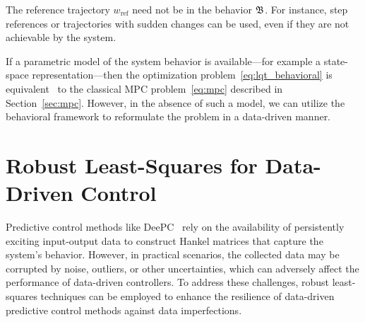 \begin{Note}
    The reference trajectory $w_{\textrm{ref}}$ need not be in the behavior $\mathfrak{B}$. For instance, step references or trajectories with sudden changes can be used, even if they are not achievable by the system.
\end{Note}

If a parametric model of the system behavior is available---for example a state-space representation---then the optimization problem~\eqref{eq:lqt_behavioral} is equivalent~\cite{jeremy2019} to the classical MPC problem~\eqref{eq:mpc} described in Section~\ref{sec:mpc}. However, in the absence of such a model, we can utilize the behavioral framework to reformulate the problem in a data-driven manner.

\section{Robust Least-Squares for Data-Driven Control}
Predictive control methods like DeePC~\cite{jeremy2019} rely on the availability of persistently exciting input-output data to construct Hankel matrices that capture the system's behavior. However, in practical scenarios, the collected data may be corrupted by noise, outliers, or other uncertainties, which can adversely affect the performance of data-driven controllers. To address these challenges, robust least-squares techniques can be employed to enhance the resilience of data-driven predictive control methods against data imperfections.

